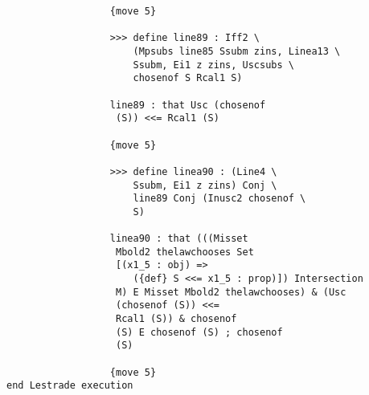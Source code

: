 \documentclass[12pt]{article}
\begin{document}
\begin{verbatim}
                  {move 5}

                  >>> define line89 : Iff2 \
                      (Mpsubs line85 Ssubm zins, Linea13 \
                      Ssubm, Ei1 z zins, Uscsubs \
                      chosenof S Rcal1 S)

                  line89 : that Usc (chosenof 
                   (S)) <<= Rcal1 (S)

                  {move 5}

                  >>> define linea90 : (Line4 \
                      Ssubm, Ei1 z zins) Conj \
                      line89 Conj (Inusc2 chosenof \
                      S)

                  linea90 : that (((Misset 
                   Mbold2 thelawchooses Set 
                   [(x1_5 : obj) => 
                      ({def} S <<= x1_5 : prop)]) Intersection 
                   M) E Misset Mbold2 thelawchooses) & (Usc 
                   (chosenof (S)) <<= 
                   Rcal1 (S)) & chosenof 
                   (S) E chosenof (S) ; chosenof 
                   (S)

                  {move 5}
end Lestrade execution

\end{verbatim}
\end{document}
